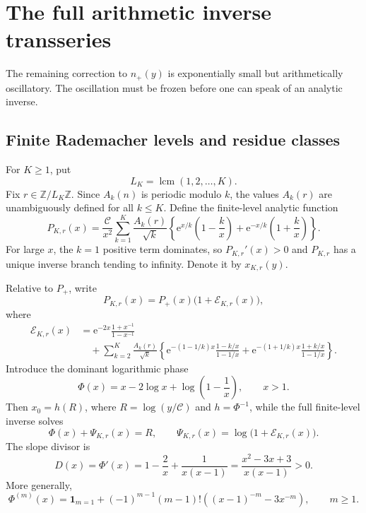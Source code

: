 \documentclass[11pt,a4paper]{article}
\numberwithin{equation}{section}
\theoremstyle{remark}
\newcommand{\e}{\mathrm e}
\newcommand{\ZZ}{\mathbb Z}
\newcommand{\Ccal}{\mathcal C}
\newcommand{\Ecal}{\mathcal E}
\begin{document}
\section{The full arithmetic inverse transseries}\label{sec:full-inverse}

The remaining correction to $n_+(y)$ is exponentially small but arithmetically oscillatory.  The oscillation must be frozen before one can speak of an analytic inverse.

\subsection{Finite Rademacher levels and residue classes}

For $K\ge1$, put
\begin{equation}\label{eq:LK}
 L_K=\operatorname{lcm}(1,2,\ldots,K).
\end{equation}
Fix $r\in\ZZ/L_K\ZZ$.  Since $A_k(n)$ is periodic modulo $k$, the values $A_k(r)$ are unambiguously defined for all $k\le K$.  Define the finite-level analytic function
\begin{equation}\label{eq:PKr}
 P_{K,r}(x)=\frac{\Ccal}{x^2}
 \sum_{k=1}^{K}\frac{A_k(r)}{\sqrt{k}}
 \left\{
 \e^{x/k}\left(1-\frac{k}{x}\right)
 +\e^{-x/k}\left(1+\frac{k}{x}\right)
 \right\}.
\end{equation}
For large $x$, the $k=1$ positive term dominates, so $P_{K,r}'(x)>0$ and $P_{K,r}$ has a unique inverse branch tending to infinity.  Denote it by $x_{K,r}(y)$.

Relative to $P_+$, write
\begin{equation}\label{eq:EKr}
 P_{K,r}(x)=P_+(x)\bigl(1+\Ecal_{K,r}(x)\bigr),
\end{equation}
where
\begin{align}
 \Ecal_{K,r}(x)
 &=\e^{-2x}\frac{1+x^{-1}}{1-x^{-1}}\label{eq:EKr-explicit}\\
 &\quad+\sum_{k=2}^{K}\frac{A_k(r)}{\sqrt{k}}
 \left\{
 \e^{-(1-1/k)x}\frac{1-k/x}{1-1/x}
 +\e^{-(1+1/k)x}\frac{1+k/x}{1-1/x}
 \right\}.
 \nonumber
\end{align}
Introduce the dominant logarithmic phase
\begin{equation}\label{eq:Phi-def}
 \Phi(x)=x-2\log x+\log\left(1-\frac1x\right),
 \qquad x>1.
\end{equation}
Then $x_0=h(R)$, where $R=\log(y/\Ccal)$ and $h=\Phi^{-1}$, while the full finite-level inverse solves
\begin{equation}\label{eq:phase-full}
 \Phi(x)+\Psi_{K,r}(x)=R,
 \qquad
 \Psi_{K,r}(x)=\log\bigl(1+\Ecal_{K,r}(x)\bigr).
\end{equation}
The slope divisor is
\begin{equation}\label{eq:D0}
 D(x)=\Phi'(x)
 =1-\frac2x+\frac1{x(x-1)}
 =\frac{x^2-3x+3}{x(x-1)}>0.
\end{equation}
More generally,
\begin{equation}\label{eq:Phi-derivatives}
 \Phi^{(m)}(x)=\mathbf1_{m=1}
 +(-1)^{m-1}(m-1)!
 \left((x-1)^{-m}-3x^{-m}\right),\qquad m\ge1.
\end{equation}
\end{document}
